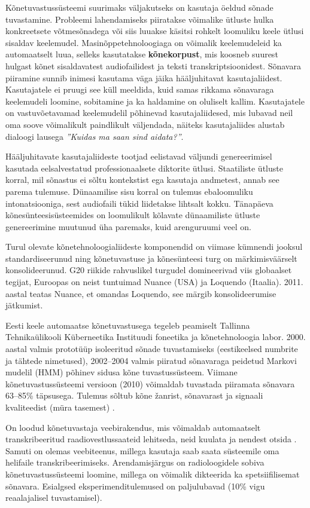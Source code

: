 \begin{multicols}{2}
Kõnetuvastussüsteemi suurimaks väljakutseks on kasutaja öeldud sõnade tuvastamine. 
Probleemi lahendamiseks piiratakse võimalike ütluste hulka konkreetsete võtmesõnadega või siis luuakse käsitsi rohkelt loomuliku keele ütlusi sisaldav keelemudel. 
Masinõppetehnoloogiaga on võimalik keelemudeleid ka automaatselt luua, selleks kasutatakse \textbf{kõnekorpust}, mis koosneb suurest hulgast kõnet sisaldavatest audiofailidest ja teksti transkriptsioonidest. 
Sõnavara piiramine sunnib inimesi kasutama väga jäika hääljuhitavat kasutajaliidest. 
Kasutajatele ei pruugi see küll meeldida, kuid samas rikkama sõnavaraga keelemudeli loomine, sobitamine ja ka haldamine on oluliselt kallim. 
Kasutajatele on vastuvõetavamad keelemudelil põhinevad kasutajaliidesed, mis lubavad neil oma soove võimalikult paindlikult väljendada, näiteks kasutajaliides alustab dialoogi lausega \textit{''Kuidas ma saan sind aidata?''}. 

Hääljuhitavate kasutajaliideste tootjad eelistavad väljundi genereerimisel kasutada eelsalvestatud professionaalsete diktorite ütlusi. 
Staatiliste ütluste korral, mil sõnastus ei sõltu kontekstist ega kasutaja andmetest, annab see parema tulemuse. 
Dünaamilise sisu korral on tulemus ebaloomuliku intonatsiooniga, sest audiofaili tükid liidetakse lihtsalt kokku. 
Tänapäeva kõnesünteesisüsteemides on loomulikult kõlavate dünaamiliste ütluste genereerimine muutunud üha paremaks, kuid arenguruumi veel on. 

Turul olevate kõnetehnoloogialiideste komponendid on viimase kümnendi jooksul standardiseerunud ning kõnetuvastuse ja kõnesünteesi turg on märkimisväärselt konsolideerunud. 
G20 riikide rahvuslikel turgudel domineerivad viis globaalset tegijat, Euroopas on neist tuntuimad Nuance (USA) ja Loquendo (Itaalia). 
2011. aastal teatas Nuance, et omandas Loquendo, see märgib konsolideerumise jätkumist.

Eesti keele automaatse kõnetuvastusega tegeleb peamiselt Tallinna Tehnikaülikooli Küberneetika Instituudi foneetika ja kõnetehnoloogia labor. 
2000. aastal valmis prototüüp isoleeritud sõnade tuvastamiseks (eestikeelsed numbrite ja tähtede nimetused), 2002--2004 valmis piiratud sõnavaraga peidetud Markovi mudelil (HMM) põhinev sidusa kõne tuvastussüsteem. 
Viimane kõnetuvastussüsteemi versioon (2010) võimaldab tuvastada piiramata sõnavara 63--85\% täpsusega. Tulemus sõltub kõne žanrist, sõnavarast ja signaali kvaliteedist (müra tasemest) \cite{Phon}.

On loodud kõnetuvastaja veebirakendus, mis võimaldab automaatselt transkribeeritud raadiovestlussaateid lehitseda, neid kuulata ja nendest otsida . 
Samuti on olemas veebiteenus, millega kasutaja saab saata süsteemile oma helifaile transkribeerimiseks. 
Arendamisjärgus on radioloogidele sobiva kõnetuvastussüsteemi loomine, millega on võimalik dikteerida ka spetsiifilisemat sõnavara. 
Esialgsed eksperimenditulemused on paljulubavad (10\% vigu reaalajalisel tuvastamisel). 


\end{multicols}
